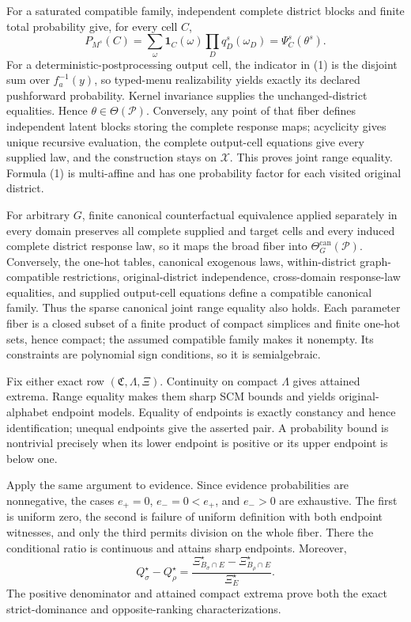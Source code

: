 For a saturated compatible family, independent complete district blocks and finite total probability give, for every cell \(C\),
\[
P_{M^s}(C)=
\sum_{\omega}\mathbf1_C(\omega)
\prod_Dq_D^s(\omega_D)=\Psi_C^s(\theta^s).
\tag{1}
\]
For a deterministic-postprocessing output cell, the indicator in (1) is the disjoint sum over \(f_a^{-1}(y)\), so typed-menu realizability yields exactly its declared pushforward probability.  Kernel invariance supplies the unchanged-district equalities.  Hence \(\theta\in\Theta(\mathcal P)\).  Conversely, any point of that fiber defines independent latent blocks storing the complete response maps; acyclicity gives unique recursive evaluation, the complete output-cell equations give every supplied law, and the construction stays on \(\mathcal X\).  This proves joint range equality.  Formula (1) is multi-affine and has one probability factor for each visited original district.

For arbitrary \(G\), finite canonical counterfactual equivalence applied separately in every domain preserves all complete supplied and target cells and every induced complete district response law, so it maps the broad fiber into \(\Theta_G^{\mathrm{can}}(\mathcal P)\).  Conversely, the one-hot tables, canonical exogenous laws, within-district graph-compatible restrictions, original-district independence, cross-domain response-law equalities, and supplied output-cell equations define a compatible canonical family.  Thus the sparse canonical joint range equality also holds.  Each parameter fiber is a closed subset of a finite product of compact simplices and finite one-hot sets, hence compact; the assumed compatible family makes it nonempty.  Its constraints are polynomial sign conditions, so it is semialgebraic.

Fix either exact row \((\mathfrak C,\Lambda,\Xi)\).  Continuity on compact \(\Lambda\) gives attained extrema.  Range equality makes them sharp SCM bounds and yields original-alphabet endpoint models.  Equality of endpoints is exactly constancy and hence identification; unequal endpoints give the asserted pair.  A probability bound is nontrivial precisely when its lower endpoint is positive or its upper endpoint is below one.

Apply the same argument to evidence.  Since evidence probabilities are nonnegative, the cases \(e_+=0\), \(e_-=0<e_+\), and \(e_->0\) are exhaustive.  The first is uniform zero, the second is failure of uniform definition with both endpoint witnesses, and only the third permits division on the whole fiber.  There the conditional ratio is continuous and attains sharp endpoints.  Moreover,
\[
Q_\sigma^\star-Q_\rho^\star=
\frac{\Xi_{B_\sigma\cap E}^\star-
\Xi_{B_\rho\cap E}^\star}{\Xi_E^\star}.
\]
The positive denominator and attained compact extrema prove both the exact strict-dominance and opposite-ranking characterizations.

